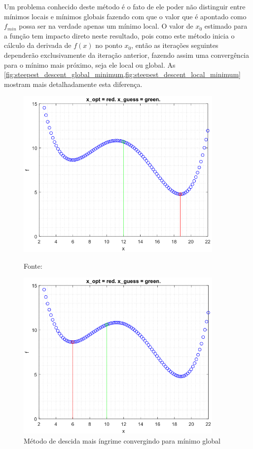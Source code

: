 Um problema conhecido deste método é o fato de ele poder não distinguir entre
mínimos locais e mínimos globais fazendo com que o valor que é apontado como
$f_{min}$ possa ser na verdade apenas um mínimo local. O valor de $x_0$
estimado para a função tem impacto direto neste resultado, pois como este método
inicia o cálculo da derivada de $f(x)$ no ponto $x_0$, então as iterações seguintes
dependerão exclusivamente da iteração anterior, fazendo assim uma convergência para
o mínimo mais próximo, seja ele local ou global. As
\cref{fig:steepest_descent_global_minimum,fig:steepest_descent_local_minimum}
mostram mais detalhadamente esta diferença.

\begin{figure}
    \centering
    \begin{minipage}{0.47\textwidth}
        \centering
        \includegraphics[width=0.9\textwidth]{./5_images/steepest_descent_global_minimum.png} 
		\caption{Método de descida mais íngrime convergindo para mínimo global}
		\label{fig:steepest_descent_global_minimum}
		Fonte: 
    \end{minipage}\hfill
    \begin{minipage}{0.47\textwidth}
        \centering
        \includegraphics[width=0.9\textwidth]{./5_images/steepest_descent_local_minimum.png} 

\end{minipage}
\end{figure}

